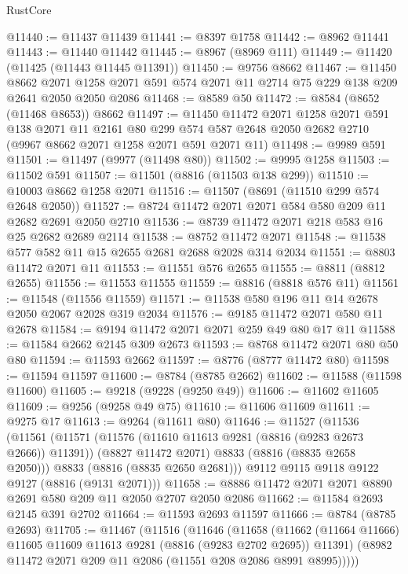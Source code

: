 \begin{lexlean}{RustCore}
\begin{coremodule}
@11440 := @11437 @11439
@11441 := @8397 @1758
@11442 := @8962 @11441
@11443 := @11440 @11442
@11445 := @8967 (@8969 @111)
@11449 := @11420 (@11425 (@11443 @11445 @11391))
@11450 := @9756 @8662
@11467 := @11450
    @8662
    @2071
    @1258
    @2071
    @591
    @574
    @2071
    @11
    @2714
    @75
    @229
    @138
    @209
    @2641
    @2050
    @2050
    @2086
@11468 := @8589 @50
@11472 := @8584 (@8652 (@11468 @8653)) @8662
@11497 := @11450
    @11472
    @2071
    @1258
    @2071
    @591
    @138
    @2071
    @11
    @2161
    @80
    @299
    @574
    @587
    @2648
    @2050
    @2682
    @2710
    (@9967 @8662 @2071 @1258 @2071 @591 @2071 @11)
@11498 := @9989 @591
@11501 := @11497 (@9977 (@11498 @80))
@11502 := @9995 @1258
@11503 := @11502 @591
@11507 := @11501 (@8816 (@11503 @138 @299))
@11510 := @10003 @8662 @1258 @2071
@11516 := @11507 (@8691 (@11510 @299 @574 @2648 @2050))
@11527 := @8724 @11472 @2071 @2071 @584 @580 @209 @11 @2682 @2691 @2050 @2710
@11536 := @8739 @11472 @2071 @218 @583 @16 @25 @2682 @2689 @2114
@11538 := @8752 @11472 @2071
@11548 := @11538 @577 @582 @11 @15 @2655 @2681 @2688 @2028 @314 @2034
@11551 := @8803 @11472 @2071 @11
@11553 := @11551 @576 @2655
@11555 := @8811 (@8812 @2655)
@11556 := @11553 @11555
@11559 := @8816 (@8818 @576 @11)
@11561 := @11548 (@11556 @11559)
@11571 := @11538 @580 @196 @11 @14 @2678 @2050 @2067 @2028 @319 @2034
@11576 := @9185 @11472 @2071 @580 @11 @2678
@11584 := @9194 @11472 @2071 @2071 @259 @49 @80 @17 @11
@11588 := @11584 @2662 @2145 @309 @2673
@11593 := @8768 @11472 @2071 @80 @50 @80
@11594 := @11593 @2662
@11597 := @8776 (@8777 @11472 @80)
@11598 := @11594 @11597
@11600 := @8784 (@8785 @2662)
@11602 := @11588 (@11598 @11600)
@11605 := @9218 (@9228 (@9250 @49))
@11606 := @11602 @11605
@11609 := @9256 (@9258 @49 @75)
@11610 := @11606 @11609
@11611 := @9275 @17
@11613 := @9264 (@11611 @80)
@11646 := @11527
    (@11536
      (@11561
        (@11571
          (@11576 (@11610 @11613 @9281 (@8816 (@9283 @2673 @2666)) @11391))
          (@8827 @11472 @2071)
          @8833
          (@8816 (@8835 @2658 @2050)))
        @8833
        (@8816 (@8835 @2650 @2681)))
      @9112
      @9115
      @9118
      @9122
      @9127
      (@8816 (@9131 @2071)))
@11658 := @8886 @11472 @2071 @2071 @8890 @2691 @580 @209 @11 @2050 @2707 @2050 @2086
@11662 := @11584 @2693 @2145 @391 @2702
@11664 := @11593 @2693 @11597
@11666 := @8784 (@8785 @2693)
@11705 := @11467
    (@11516
      (@11646
        (@11658
          (@11662 (@11664 @11666) @11605 @11609 @11613 @9281 (@8816 (@9283 @2702 @2695)) @11391)
          (@8982 @11472 @2071 @209 @11 @2086 (@11551 @208 @2086 @8991 @8995)))))

\end{coremodule}
\end{lexlean}
